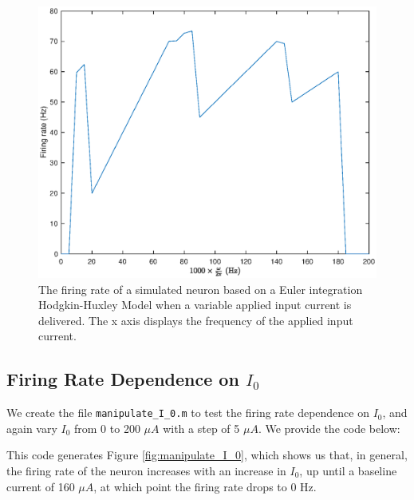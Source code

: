\documentclass[11pt, oneside]{article}
\begin{document}
\begin{figure}[ht!]
\centering
\includegraphics[width=1\textwidth]{manipulate_omega.eps}
\caption{The firing rate of a simulated neuron based on a Euler integration Hodgkin-Huxley Model when a variable applied input current is delivered. The x axis displays the frequency of the applied input current.}
\label{fig:manipulate_omega}
\end{figure}

\subsection{Firing Rate Dependence on $I_0$}

We create the file \lstinline{manipulate_I_0.m} to test the firing rate dependence on $I_0$, and again vary $I_0$ from 0 to 200 $\mu A$ with a step of 5 $\mu A$. We provide the code below:

This code generates Figure \ref{fig:manipulate_I_0}, which shows us that, in general, the firing rate of the neuron increases with an increase in $I_0$, up until a baseline current of 160 $\mu A$, at which point the firing rate drops to 0 Hz.
\end{document}
